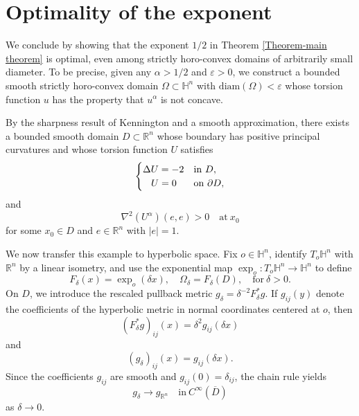 \documentclass[11pt]{amsart}
\numberwithin{theorem}{section}
\numberwithin{equation}{section}
\begin{document}
\section{Optimality of the exponent}\label{Section 7}

We conclude by showing that the exponent $1/2$ in Theorem \ref{Theorem-main theorem} is optimal, even among strictly horo-convex domains of arbitrarily small diameter. To be precise, given any $\alpha>1/2$ and $\varepsilon>0$, we construct a bounded smooth strictly horo-convex domain $\Omega\subset\mathbb{H}^n$ with $\mathrm{diam}(\Omega)<\varepsilon$ whose torsion function $u$ has the property that $u^\alpha$ is not concave.

By the sharpness result of Kennington \cite{Kennington1985} and a smooth approximation, there exists a bounded smooth domain $D\subset\mathbb{R}^n$ whose boundary has positive principal curvatures and whose torsion function $U$ satisfies $$\begin{cases}
\Delta U=-2 & \mathrm{in}\ D,\\
\hspace{0.3cm} U=0 & \mathrm{on}\ \partial D,
\end{cases}$$ and
\begin{equation}\label{Euclidean positive direction}
\nabla^2(U^\alpha)(e,e)>0\quad\mathrm{at}\ x_0
\end{equation}
for some $x_0\in D$ and $e\in\mathbb{R}^n$ with $|e|=1$.

We now transfer this example to hyperbolic space. Fix $o\in\mathbb{H}^n$, identify $T_o\mathbb{H}^n$ with $\mathbb{R}^n$ by a linear isometry, and use the exponential map $\exp_o: T_o\mathbb{H}^n\rightarrow\mathbb{H}^n$ to define $$F_\delta(x)=\exp_o(\delta x),\quad \Omega_\delta=F_\delta(D),\quad\mathrm{for}\ \delta>0.$$ On $D$, we introduce the rescaled pullback metric $g_\delta=\delta^{-2}F_\delta^\ast g$. If $g_{ij}(y)$ denote the coefficients of the hyperbolic metric in normal coordinates centered at $o$, then $$(F_\delta^\ast g)_{ij}(x)=\delta^2g_{ij}(\delta x)$$ and $$(g_\delta)_{ij}(x)=g_{ij}(\delta x).$$ Since the coefficients $g_{ij}$ are smooth and $g_{ij}(0)=\delta_{ij}$, the chain rule yields $$g_\delta\rightarrow g_{\mathbb{R}^n}\quad\mathrm{in}\ C^\infty(\overline{D})$$ as $\delta\rightarrow 0$.
\end{document}
